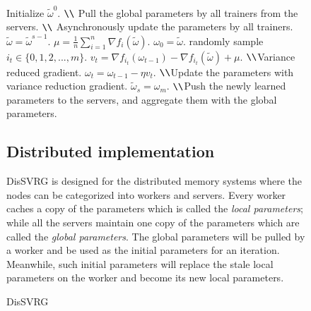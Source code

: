 \documentclass[preprint,review,11pt,a4paper]{elsarticle}
\begin{document}
\begin{figure}
\begin{algorithm}[t]
    \caption{DisSVRG}
    \label{algorithm_dis_svrg}
    \begin{algorithmic}[1]
        \State Initialize $\tilde{\omega}^0$. $ \verb|\\|$ Pull the global parameters by all trainers from the servers.
         $ \verb|\\|$ Asynchronously update the parameters by all trainers.
            \State $\tilde{\omega}=\tilde{\omega}^{s-1}$.
            \State $\mu=\frac{1}{n}\sum\limits_{i=1}^n\nabla f_i(\tilde{\omega})$.
            \State $\omega_0=\tilde{\omega}$.
                \State randomly sample $i_t\in\{0,1,2,...,m\}$.
                \State $v_t=\nabla f_{i_t}(\omega_{t-1})-\nabla f_{i_t}(\tilde{\omega})+\mu$. $ \verb|\\|$Variance reduced gradient.
                \State $\omega_t=\omega_{t-1}-\eta v_t$. $ \verb|\\|$Update the parameters with variance reduction gradient.
           \EndFor
           \State $\tilde{\omega}_s=\omega_m$. $ \verb|\\|$Push the newly learned parameters to the servers, and aggregate them with the global parameters.
       \EndFor
    \end{algorithmic}
\end{algorithm}

\subsection{Distributed implementation}
DisSVRG is designed for the distributed memory systems where the nodes can be categorized into workers and servers. Every worker caches a copy of the parameters which is called the \emph{local parameters}; while all the servers maintain one copy of the parameters which are called the \emph{global parameters}. The global parameters will be pulled by a worker and be used as the initial parameters for an iteration. Meanwhile, such initial parameters will replace the stale local parameters on the worker and become its new local parameters.


\end{figure}
\end{document}

